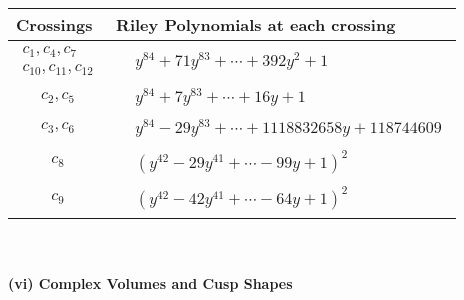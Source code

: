\documentclass[1p]{elsarticle_modified}
\theoremstyle{definition}
\begin{document}
\begin{tabular}{m{50pt}|m{274pt}}
Crossings & \hspace{64pt}Riley Polynomials at each crossing \\
\hline $$\begin{aligned}c_{1},c_{4},c_{7}\\c_{10},c_{11},c_{12}\end{aligned}$$&$\begin{aligned}
&y^{84}+71 y^{83}+\cdots+392 y^2+1
\end{aligned}$\\
\hline $$\begin{aligned}c_{2},c_{5}\end{aligned}$$&$\begin{aligned}
&y^{84}+7 y^{83}+\cdots+16 y+1
\end{aligned}$\\
\hline $$\begin{aligned}c_{3},c_{6}\end{aligned}$$&$\begin{aligned}
&y^{84}-29 y^{83}+\cdots+1118832658 y+118744609
\end{aligned}$\\
\hline $$\begin{aligned}c_{8}\end{aligned}$$&$\begin{aligned}
&(y^{42}-29 y^{41}+\cdots-99 y+1)^{2}
\end{aligned}$\\
\hline $$\begin{aligned}c_{9}\end{aligned}$$&$\begin{aligned}
&(y^{42}-42 y^{41}+\cdots-64 y+1)^{2}
\end{aligned}$\\
\hline
\end{tabular}\\~\\
\newpage\flushleft \textbf{(vi) Complex Volumes and Cusp Shapes}
\end{document}
